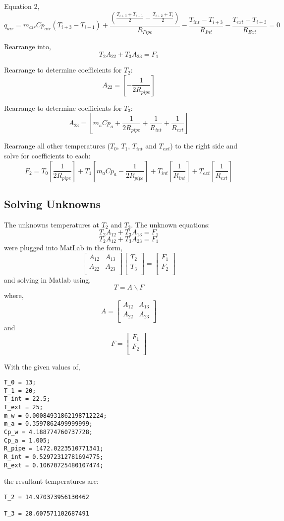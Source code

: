 \documentclass[12pt]{report}
\begin{document}
Equation 2, 
$$ q_{air} = m_{air} Cp_{air} (T_{i+3}-T_{i+1}) 
+ \frac{
	\left( 
	\frac{T_{i+3}+T_{i+1}}{2} 
	- \frac{T_{i+2}+T_{i}}{2} 
	\right)}
{R_{Pipe}} 
- \frac{T_{int} - T_{i+3}}{R_{Int}}
- \frac{T_{ext} - T_{i+3}}{R_{Ext}} = 0 $$

Rearrange into,
$$ T_2 A_{22} + T_3 A_{23} = F_1 $$

Rearrange to determine coefficients for $T_2$:
$$ A_{22} = [- \frac{1}{2 R_{pipe}}] $$

Rearrange to determine coefficients for $T_3$:
$$ A_{23} = [ m_a Cp_a + \frac{1}{2 R_{pipe}} + \frac{1}{R_{int}} + \frac{1}{R_{ext}}] $$

Rearrange all other temperatures ($T_0$, $T_1$, $T_{int}$ and $T_{ext}$) to the right side and solve for coefficients to each:
$$ F_2 = 
	T_0 [\frac{1}{2 R_{pipe}}] 
	+ T_1 [m_a Cp_a - \frac{1}{2 R_{pipe}}] 
	+ T_{int} [\frac{1}{R_{int}}]
	+ T_{ext} [\frac{1}{R_{ext}}]$$


\subsection{Solving Unknowns}
The unknowns temperatures at $T_2$ and $T_3$. The unknown equations: 
$$ T_2 A_{12} + T_3 A_{13} = F_1 $$
$$ T_2 A_{12} + T_3 A_{23} = F_1 $$
were plugged into MatLab in the form, 
$$
\left[ \begin{matrix}
A_{12} & A_{13} \\
A_{22} & A_{23} \\
\end{matrix}\right] 
\left[ \begin{matrix}
T_{2} \\
T_{3} \\
\end{matrix}
\right] 
= \left[ \begin{matrix}
F_1 \\
F_2 \\
\end{matrix}
\right]
$$
and solving in Matlab using,
$$ T = A \backslash F $$
where, 
$$ A = \left[ \begin{matrix}
A_{12} & A_{13} \\
A_{22} & A_{23} \\
\end{matrix}\right] $$
and
$$ F = \left[ \begin{matrix}
F_1 \\
F_2 \\
\end{matrix}
\right] $$

With the given values of,
\begin{lstlisting}
T_0 = 13;
T_1 = 20;
T_int = 22.5;
T_ext = 25;
m_w = 0.00084931862198712224;
m_a = 0.3597862499999999;
Cp_w = 4.188774760737728;
Cp_a = 1.005; 
R_pipe = 1472.0223510771341;
R_int = 0.52972312781694775;
R_ext = 0.10670725480107474;
\end{lstlisting}
the resultant temperatures are:
\begin{lstlisting}
T_2 = 14.970373956130462

T_3 = 28.607571102687491
\end{lstlisting}


        
\end{document}
